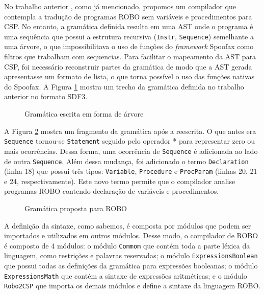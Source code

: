 No trabalho anterior \cite{nogueira}, como já mencionado, propomos um compilador que contempla a tradução de programas ROBO sem variáveis e procedimentos para CSP. No entanto, a gramática definida resulta em uma AST onde o programa é uma sequência que possui a estrutura recursiva (\texttt{Instr}, \texttt{Sequence}) semelhante a uma árvore, o que impossibilitava o uso de funções do \textit{framework} Spoofax como filtros que trabalham com sequencias. Para facilitar o mapeamento da AST para CSP, foi necessário reconstruir partes da gramática de modo que a AST gerada apresentasse um formato de lista, o que torna possível o uso das funções nativas do Spoofax. A Figura \ref{fig:gramatica_antes} mostra um trecho da gramática definida no trabalho anterior no formato SDF3. 

\begin{figure}[h]
\caption{Gramática escrita em forma de árvore}

\label{fig:gramatica_antes}
\end{figure}

A Figura \ref{fig:gramatica} mostra um fragmento da gramática após a reescrita. O que antes era \texttt{Sequence} tornou-se \texttt{Statement} seguido pelo operador * para representar zero ou mais ocorrências. Dessa forma, uma ocorrência de \texttt{Sequence} é adicionada ao lado de outra \texttt{Sequence}. Além dessa mudança, foi adicionado o termo \texttt{Declaration} (linha 18) que possui três tipos: \texttt{Variable}, \texttt{Procedure} e \texttt{ProcParam} (linhas 20, 21 e 24, respectivamente). Este novo termo permite que o compilador analise programas ROBO contendo declaração de variáveis e procedimentos. 

\begin{figure}[h]
\caption{Gramática proposta para ROBO}

\label{fig:gramatica}
\end{figure}

A definição da sintaxe, como sabemos, é composta por módulos que podem ser importados e utilizados em outros módulos. Desse modo, o compilador de ROBO é composto de 4 módulos: o módulo \texttt{Commom} que contém toda a parte léxica da linguagem, como restrições e palavras reservadas; o módulo \texttt{ExpressionsBoolean} que possui todas as definições da gramática para expressões booleanas; o módulo \texttt{ExpressionsMath} que contém a sintaxe de expressões aritméticas; e o módulo \texttt{Robo2CSP} que importa os demais módulos e define a sintaxe da linguagem ROBO.

